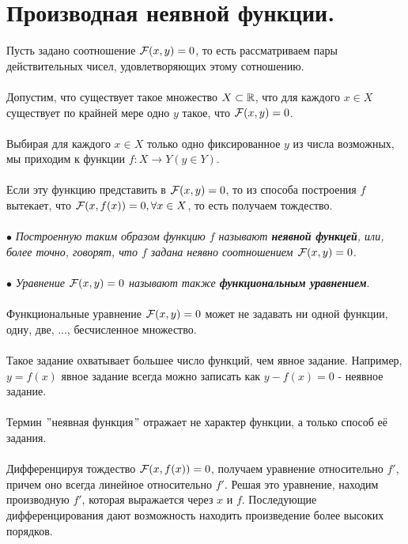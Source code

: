 \section{Производная неявной функции.}
Пусть задано соотношение $\mathcal{F}(x,y) = 0$, то есть рассматриваем пары действительных чисел, удовлетворяющих этому сотношению.
\\\\   Допустим, что существует такое множество $X \subset \mathbb{R}$, что для каждого $x \in X$ существует по крайней мере одно $y$ такое, что $\mathcal{F}(x,y) = 0$.
\\\\   Выбирая для каждого $x \in X$ только одно фиксированное $y$ из числа возможных, мы приходим к функции $f: X \rightarrow Y  (y \in Y).$
\\\\   Если эту функцию представить в $\mathcal{F}(x,y) = 0$, то из способа построения $f$ вытекает, что $\mathcal{F}(x,f(x)) = 0, \forall x \in X$, то есть получаем тождество.
\\\\  $\bullet$ \textit{Построенную таким образом функцию $f$ называют \textbf{неявной функцей}, или, более точно, говорят, что $f$ задана неявно соотношением $\mathcal{F}(x,y) = 0$.}
\\\\  $\bullet$ \textit{Уравнение $\mathcal{F}(x,y) = 0$ называют также \textbf{функциональным уравнением}}.
\\\\   Функциональные уравнение $\mathcal{F}(x,y) = 0$ может не задавать ни одной функции, одну, две, ..., бесчисленное множество.
\\\\   Такое задание охватывает большее число функций, чем явное задание. Например, $y = f(x)$ явное задание всегда можно записать как $y - f(x) = 0$ - неявное задание.
\\\\   Термин $"$неявная функция$"$ отражает не характер функции, а только способ её задания. 
\\\\   Дифференцируя тождество $\mathcal{F}(x,f(x)) = 0$, получаем уравнение относительно $f'$, причем оно всегда линейное относительно $f'$. Решая это уравнение, находим производную $f'$, которая выражается через $x$ и $f$. Последующие дифференцирования дают возможность находить произведение более высоких порядков.
